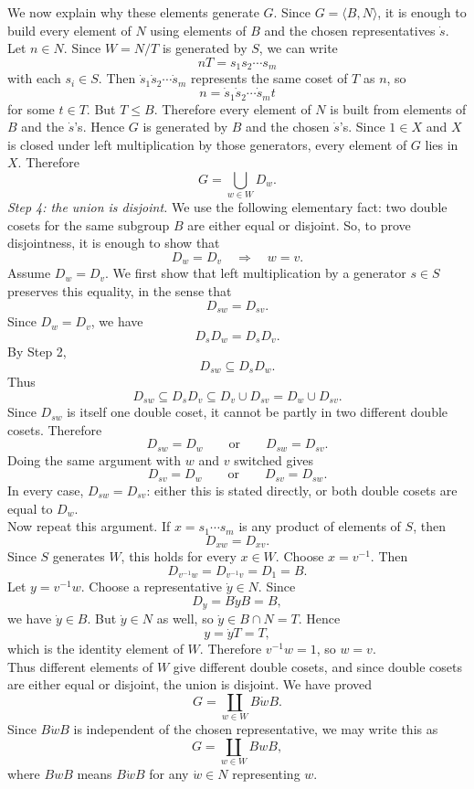 \documentclass[../Odyssey_Project.tex]{subfiles}
\begin{document}
\begin{solution}
We now explain why these elements generate $G$. Since $G=\langle B,N\rangle$, it is enough to build every element of $N$ using elements of $B$ and the chosen representatives $\dot s$. Let $n\in N$. Since $W=N/T$ is generated by $S$, we can write
\[
    nT=s_1s_2\cdots s_m
\]
with each $s_i\in S$. Then $\dot s_1\dot s_2\cdots \dot s_m$ represents the same coset of $T$ as $n$, so
\[
    n=\dot s_1\dot s_2\cdots \dot s_m t
\]
for some $t\in T$. But $T\leq B$. Therefore every element of $N$ is built from elements of $B$ and the $\dot s$'s. Hence $G$ is generated by $B$ and the chosen $\dot s$'s. Since $1\in X$ and $X$ is closed under left multiplication by those generators, every element of $G$ lies in $X$. Therefore
\[
    G=\bigcup_{w\in W}D_w.
\]
\emph{Step 4: the union is disjoint.} We use the following elementary fact: two double cosets for the same subgroup $B$ are either equal or disjoint. So, to prove disjointness, it is enough to show that
\[
    D_w=D_v
    \quad\Longrightarrow\quad
    w=v.
\]
Assume $D_w=D_v$. We first show that left multiplication by a generator $s\in S$ preserves this equality, in the sense that
\[
    D_{sw}=D_{sv}.
\]
Since $D_w=D_v$, we have
\[
    D_sD_w=D_sD_v.
\]
By Step 2,
\[
    D_{sw}\subseteq D_sD_w.
\]
Thus
\[
    D_{sw}\subseteq D_sD_v\subseteq D_v\cup D_{sv}=D_w\cup D_{sv}.
\]
Since $D_{sw}$ is itself one double coset, it cannot be partly in two different double cosets. Therefore
\[
    D_{sw}=D_w
    \qquad\text{or}\qquad
    D_{sw}=D_{sv}.
\]
Doing the same argument with $w$ and $v$ switched gives
\[
    D_{sv}=D_w
    \qquad\text{or}\qquad
    D_{sv}=D_{sw}.
\]
In every case, $D_{sw}=D_{sv}$: either this is stated directly, or both double cosets are equal to $D_w$.\\
Now repeat this argument. If $x=s_1\cdots s_m$ is any product of elements of $S$, then
\[
    D_{xw}=D_{xv}.
\]
Since $S$ generates $W$, this holds for every $x\in W$. Choose $x=v^{-1}$. Then
\[
    D_{v^{-1}w}=D_{v^{-1}v}=D_1=B.
\]
Let $y=v^{-1}w$. Choose a representative $\dot y\in N$. Since
\[
    D_y=B\dot yB=B,
\]
we have $\dot y\in B$. But $\dot y\in N$ as well, so $\dot y\in B\cap N=T$. Hence
\[
    y=\dot yT=T,
\]
which is the identity element of $W$. Therefore $v^{-1}w=1$, so $w=v$.\\
Thus different elements of $W$ give different double cosets, and since double cosets are either equal or disjoint, the union is disjoint. We have proved
\[
    G=\coprod_{w\in W}B\dot wB.
\]
Since $B\dot wB$ is independent of the chosen representative, we may write this as
\[
    G=\coprod_{w\in W}BwB,
\]
where $BwB$ means $B\dot wB$ for any $\dot w\in N$ representing $w$.
\end{solution}
\end{document}
